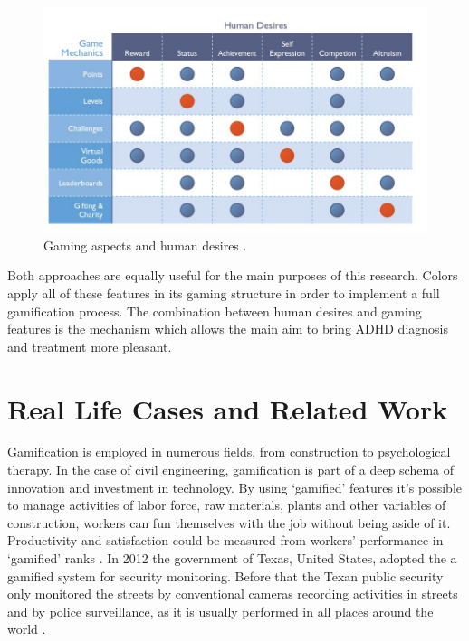 \begin{figure}[h]
	\begin{center}
		\includegraphics[scale=0.5]{chapters/gamification/img/gaming.jpg}
		\caption{Gaming aspects and human desires \citep{Bunchball}.}
		\label{taxonomy_1}
	\end{center}
\end{figure}

Both approaches are equally useful for the main purposes of this research. Colors apply all of these features in its gaming structure in order to implement a full gamification process. The combination between human desires and gaming features is the mechanism which allows the main aim to bring ADHD diagnosis and treatment more pleasant.


\section{Real Life Cases and Related Work}

Gamification is employed in numerous fields, from construction to psychological therapy. In the case of civil engineering, gamification is part of a deep schema of innovation and investment in technology. By using `gamified' features it's possible to manage activities of labor force, raw materials, plants and other variables of construction, workers can fun themselves with the job without being aside of it. Productivity and satisfaction could be measured from workers' performance in `gamified' ranks  \citep{formoso}. In 2012 the government of Texas, United States, adopted the a gamified system for security monitoring. Before that the Texan public security only monitored the streets by conventional cameras recording activities in streets and by police surveillance, as it is usually performed in all places around the world \citep{conf/cts/Aud13}.

